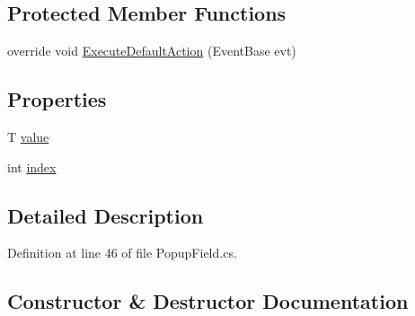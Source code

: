 \subsection*{Protected Member Functions}
\begin{DoxyCompactItemize}
\item 
override void \mbox{\hyperlink{class_unity_editor_1_1_package_manager_1_1_u_i_1_1_popup_field_af08eb4491690830c67b9567d7ecb14cc}{Execute\+Default\+Action}} (Event\+Base evt)
\end{DoxyCompactItemize}
\subsection*{Properties}
\begin{DoxyCompactItemize}
\item 
T \mbox{\hyperlink{class_unity_editor_1_1_package_manager_1_1_u_i_1_1_popup_field_aa27a791d6881262b65dea46b32578313}{value}}
\item 
int \mbox{\hyperlink{class_unity_editor_1_1_package_manager_1_1_u_i_1_1_popup_field_a2d970798a3507d033d16b4f9e90b64f1}{index}}
\end{DoxyCompactItemize}


\subsection{Detailed Description}


Definition at line 46 of file Popup\+Field.\+cs.



\subsection{Constructor \& Destructor Documentation}
\mbox{\label{class_unity_editor_1_1_package_manager_1_1_u_i_1_1_popup_field_a64c78e65aa749d7de30ffde3428eef39}} 
